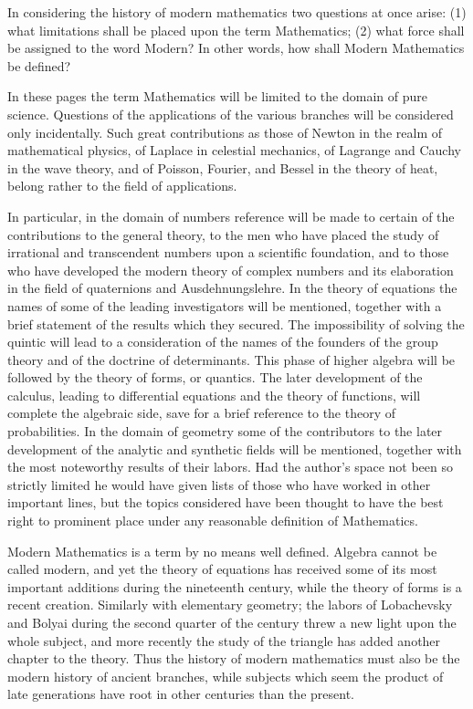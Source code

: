 \documentclass[oneside]{book}
\begin{document}
In considering the history of modern mathematics two questions at
once arise: (1) what limitations shall be placed upon the term
Mathematics; (2) what force shall be assigned to the word Modern? In
other words, how shall Modern Mathematics be defined?

In these pages the term Mathematics will be limited to the domain of
pure science. Questions of the applications of the various branches
will be considered only incidentally. Such great contributions as
those of Newton in the realm of mathematical physics, of Laplace in
celestial mechanics, of Lagrange and Cauchy in the wave theory, and
of Poisson, Fourier, and Bessel in the theory of heat, belong rather
to the field of applications.

In particular, in the domain of numbers reference will be made to
certain of the contributions to the general theory, to the men who
have placed the study of irrational and transcendent numbers upon a
scientific foundation, and to those who have developed the modern
theory of complex numbers and its elaboration in the field of
quaternions and Ausdehnungslehre. In the theory of equations the
names of some of the leading investigators will be mentioned,
together with a brief statement of the results which they
secured. The impossibility of solving the quintic will lead to a
consideration of the names of the founders of the group theory and
of the doctrine of determinants. This phase of higher algebra will
be followed by the theory of forms, or quantics. The later
development of the calculus, leading to differential equations and
the theory of functions, will complete the algebraic side, save for
a brief reference to the theory of probabilities. In the domain of
geometry some of the contributors to the later development of the
analytic and synthetic fields will be mentioned, together with the
most noteworthy results of their labors. Had the author's space not
been so strictly limited he would have given lists of those who have
worked in other important lines, but the topics considered have been
thought to have the best right to prominent place under any
reasonable definition of Mathematics.

Modern Mathematics is a term by no means well defined. Algebra
cannot be called modern, and yet the theory of equations has
received some of its most important additions during the nineteenth
century, while the theory of forms is a recent creation. Similarly
with elementary geometry; the labors of Lobachevsky and Bolyai
during the second quarter of the century threw a new light upon the
whole subject, and more recently the study of the triangle has added
another chapter to the theory. Thus the history of modern
mathematics must also be the modern history of ancient branches,
while subjects which seem the product of late generations have root
in other centuries than the present.
\end{document}
